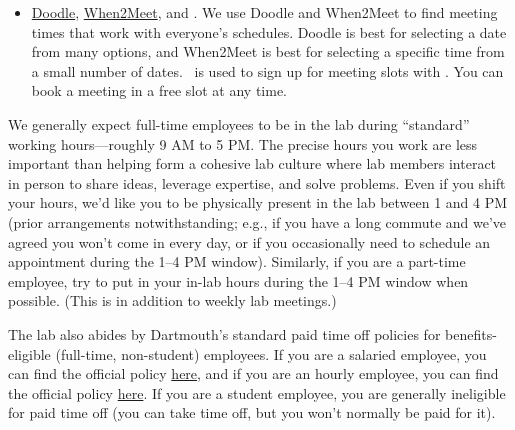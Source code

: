 \documentclass{tufte-book} %
\begin{document}
\begin{itemize}
\begin{itemize}
\begin{itemize}
\item A brief description of the event and/or other relevant
  information
\item Attach any relevant documents via Google Docs
\end{itemize}
\end{itemize}
\item \href{http://www.doodle.com}{Doodle},
  \href{http://www.when2meet.com}{When2Meet}, and
  \meeting.  We use
  Doodle and When2Meet to find meeting times that
  work with everyone's schedules.  Doodle is
  best for selecting a date from many options, and
  When2Meet is best for selecting a specific time from a
  small number of dates.  \meeting~is used to sign up
  for meeting slots with \director.  You can book a meeting in a free
  slot at any time.
\end{itemize}


 \noindent We generally expect full-time employees to be in the lab
 during ``standard'' working hours---roughly 9 AM to 5 PM.
 The precise hours you work are less important than
 helping form a cohesive lab culture where lab
 members interact in person to share ideas, leverage expertise,
 and solve problems.  Even if you shift
 your hours, we'd like you to be physically
 present in the lab between 1 and 4 PM (prior arrangements
 notwithstanding; e.g., if you have a long commute and we've agreed
 you won't come in every day, or if you occasionally need to
 schedule an appointment during the 1--4 PM window).  Similarly, if
 you are a part-time employee, try to put in your
 in-lab hours during the 1--4 PM window when possible.
 (This is in addition to weekly lab meetings.)

 The lab also abides by Dartmouth's standard paid time off policies
 for benefits-eligible (full-time, non-student) employees.  If you are
 a salaried employee, you can find the official policy
 \href{http://www.dartmouth.edu/~hrs/pdfs/paid_time_off_salaried.pdf}{here},
 and if you are an hourly employee, you can find the official policy
 \href{http://www.dartmouth.edu/~hrs/pdfs/Paid_Time_Off_Hourly.pdf}{here}.
 If you are a student employee, you are generally ineligible for paid
 time off (you can take time off, but you won't normally be paid for
 it).
\end{document}
